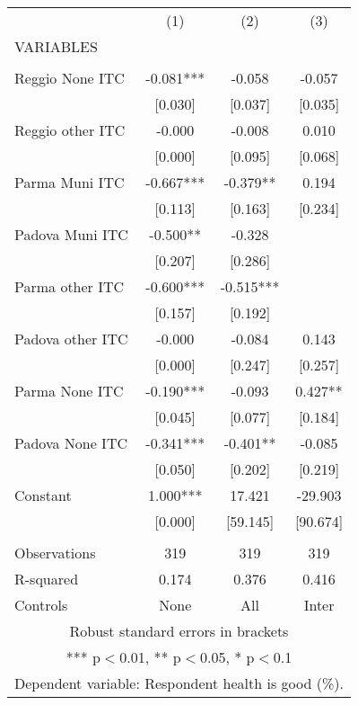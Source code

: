 \begin{tabular}{lccc} \hline
 & (1) & (2) & (3) \\
VARIABLES &  &  &  \\ \hline
 &  &  &  \\
Reggio None ITC & -0.081*** & -0.058 & -0.057 \\
 & [0.030] & [0.037] & [0.035] \\
Reggio other ITC & -0.000 & -0.008 & 0.010 \\
 & [0.000] & [0.095] & [0.068] \\
Parma Muni ITC & -0.667*** & -0.379** & 0.194 \\
 & [0.113] & [0.163] & [0.234] \\
Padova Muni ITC & -0.500** & -0.328 &  \\
 & [0.207] & [0.286] &  \\
Parma other ITC & -0.600*** & -0.515*** &  \\
 & [0.157] & [0.192] &  \\
Padova other ITC & -0.000 & -0.084 & 0.143 \\
 & [0.000] & [0.247] & [0.257] \\
Parma None ITC & -0.190*** & -0.093 & 0.427** \\
 & [0.045] & [0.077] & [0.184] \\
Padova None ITC & -0.341*** & -0.401** & -0.085 \\
 & [0.050] & [0.202] & [0.219] \\
Constant & 1.000*** & 17.421 & -29.903 \\
 & [0.000] & [59.145] & [90.674] \\
 &  &  &  \\
Observations & 319 & 319 & 319 \\
R-squared & 0.174 & 0.376 & 0.416 \\
 Controls & None & All & Inter \\ \hline
\multicolumn{4}{c}{ Robust standard errors in brackets} \\
\multicolumn{4}{c}{ *** p$<$0.01, ** p$<$0.05, * p$<$0.1} \\
\multicolumn{4}{c}{ Dependent variable: Respondent health is good (\%).} \\
\end{tabular}
